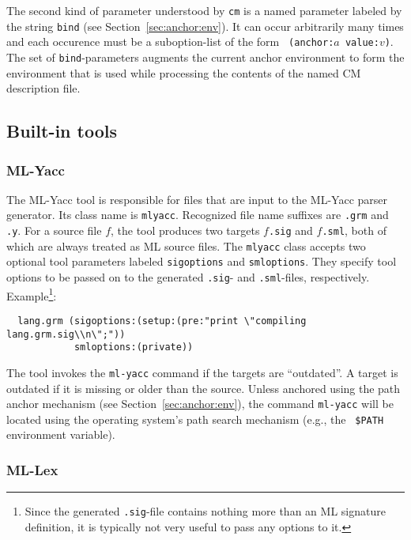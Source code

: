 \documentclass[titlepage,letterpaper]{article}
\begin{document}
The second kind of parameter understood by {\tt cm} is a named
parameter labeled by the string {\tt bind} (see
Section~\ref{sec:anchor:env}).  It can occur arbitrarily many times
and each occurence must be a suboption-list of the form {\tt
(anchor:$a$ value:$v$)}.  The set of {\tt bind}-parameters augments
the current anchor environment to form the environment that is used
while processing the contents of the named CM description file.

\subsection{Built-in tools}
\label{sec:builtin-tools}

\subsubsection{ML-Yacc}

The ML-Yacc tool is responsible for files that are input to the
ML-Yacc parser generator.  Its class name is {\tt mlyacc}.  Recognized
file name suffixes are {\tt .grm} and {\tt .y}.  For a source file
$f$, the tool produces two targets $f${\tt .sig} and $f${\tt .sml},
both of which are always treated as ML source files.  The {\tt mlyacc}
class accepts two optional tool parameters labeled {\tt sigoptions}
and {\tt smloptions}.  They specify tool options to be passed on to
the generated {\tt .sig}- and {\tt .sml}-files, respectively.
Example\footnote{Since the generated {\tt .sig}-file contains nothing
more than an ML signature definition, it is typically not very useful
to pass any options to it.}:

\begin{verbatim}
  lang.grm (sigoptions:(setup:(pre:"print \"compiling lang.grm.sig\\n\";"))
            smloptions:(private))
\end{verbatim}

The tool invokes the {\tt ml-yacc} command if the targets are
``outdated''.  A target is outdated if it is missing or older than the
source.  Unless anchored using the path anchor mechanism (see
Section~\ref{sec:anchor:env}), the command {\tt ml-yacc} will be located
using the operating system's path search mechanism (e.g., the {\tt
\$PATH} environment variable).

\subsubsection{ML-Lex}
\end{document}
